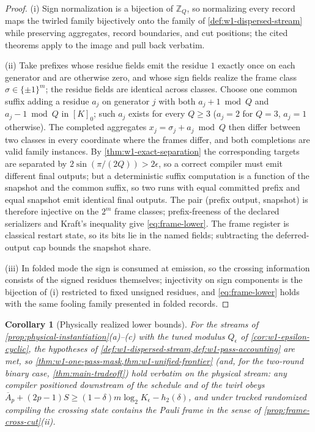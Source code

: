 \documentclass[aps,prx,reprint,floatfix,superscriptaddress]{revtex4-2}
\newtheorem{corollary}{Corollary}
\begin{document}
\begin{proof}
(i) Sign normalization is a bijection of $\mathbb Z_Q$, so normalizing
every record maps the twirled family bijectively onto the family of
\cref{def:w1-dispersed-stream} while preserving aggregates, record
boundaries, and cut positions; the cited theorems apply to the image
and pull back verbatim.

(ii) Take prefixes whose residue fields emit the residue $1$ exactly
once on each generator and are otherwise zero, and whose sign fields
realize the frame class $\sigma\in\{\pm1\}^m$; the residue fields are
identical across classes.  Choose one common suffix adding a residue
$a_j$ on generator $j$ with both $a_j+1\bmod Q$ and $a_j-1\bmod Q$ in
$[K]_0$; such $a_j$ exists for every $Q\geq3$ ($a_j=2$ for $Q=3$,
$a_j=1$ otherwise).  The completed aggregates
$x_j=\sigma_j+a_j\bmod Q$ then differ between two classes in every
coordinate where the frames differ, and both completions are valid
family instances.  By \cref{thm:w1-exact-separation} the corresponding
targets are separated by $2\sin(\pi/(2Q))>2\epsilon$, so a correct
compiler must emit different final outputs; but a deterministic suffix
computation is a function of the snapshot and the common suffix, so two
runs with equal committed prefix and equal snapshot emit identical
final outputs.  The pair (prefix output, snapshot) is therefore
injective on the $2^m$ frame classes; prefix-freeness of the declared
serializers and Kraft's inequality give \eqref{eq:frame-lower}.  The
frame register is classical restart state, so its bits lie in the named
fields; subtracting the deferred-output cap bounds the snapshot share.

(iii) In folded mode the sign is consumed at emission, so the crossing
information consists of the signed residues themselves; injectivity on
sign components is the bijection of (i) restricted to fixed unsigned
residues, and \eqref{eq:frame-lower} holds with the same fooling family
presented in folded records.
\end{proof}

\begin{corollary}[Physically realized lower bounds]
\label{cor:physical-lower-bounds}
For the streams of \cref{prop:physical-instantiation}(a)--(c) with the
tuned modulus $Q_\epsilon$ of \cref{cor:w1-epsilon-cyclic}, the
hypotheses of \cref{def:w1-dispersed-stream,def:w1-pass-accounting} are
met, so \cref{thm:w1-one-pass-mask,thm:w1-unified-frontier} (and, for
the two-round binary case, \cref{thm:main-tradeoff}) hold verbatim on
the physical stream: any compiler positioned downstream of the schedule
and of the twirl obeys
$\overline A_p+(2p-1)S\geq(1-\delta)m\log_2K_\epsilon-h_2(\delta)$, and
under tracked randomized compiling the crossing state contains the
Pauli frame in the sense of \cref{prop:frame-cross-cut}(ii).
\end{corollary}
\end{document}

